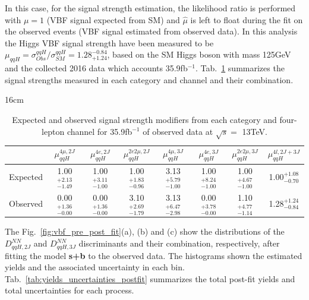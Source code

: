 In this case, for the signal strength estimation, the likelihood ratio is performed with $\mu = 1$ (VBF signal expected from SM) and $\hat{\mu}$ is left to float during the fit on the observed events (VBF signal estimated from observed data). In this analysis the Higgs VBF signal strength have been measured to be $\mu_{qqH} = \sigma_{Obs}^{qqH}/\sigma_{SM}^{qqH} = 1.28_{+1.24}^{-0.84}$, based on the SM Higgs boson with mass 125GeV and the collected 2016 data which accounts 35.9fb$^{-1}$. Tab.~\ref{tab:vbf_signal_strengths} summarizes the signal strengths measured in each category and channel and their combination.

\begin{table}[hbtp]{16cm}
	\caption{Expected and observed signal strength modifiers from each category and four-lepton channel for 35.9fb$^{-1}$ of observed data at $\sqrt{s}=$ 13TeV.}
	\centering
	\begin{tabular}{c|c|c|c|c|c|c|c}
		\hline
		\rowcolor{light_gray}
		& $\mu_{qqH}^{4\mu,2J}$ & $\mu_{qqH}^{4e,2J}$ & $\mu_{qqH}^{2e2\mu,2J}$ & $\mu_{qqH}^{4\mu,3J}$ & $\mu_{qqH}^{4e,3J}$ & $\mu_{qqH}^{2e2\mu,3J}$ & $\mu_{qqH}^{4l,2J+3J}$\\
		\hline
		Expected & 1.00$^{+2.13}_{-1.49}$ & 1.00$^{+3.11}_{-1.00}$ & 1.00$^{+1.83}_{-0.96}$ & 3.13$^{+5.79}_{-1.00}$ & 1.00$^{+8.24}_{-1.00}$ & 1.00$^{+4.67}_{-1.00}$ & 1.00$^{+1.08}_{-0.70}$ \\
		\hline
		Observed & 0.00$^{+1.36}_{-0.00}$ & 0.00$^{+1.36}_{-0.00}$ & 3.10$^{+2.69}_{-1.79}$ & 3.13$^{+6.47}_{-2.98}$ & 0.00$^{+3.78}_{-0.00}$ & 1.10$^{+4.77}_{-1.14}$ & 1.28$^{+1.24}_{-0.84}$ \\ 
		\hline
	\end{tabular}
	\label{tab:vbf_signal_strengths}
\end{table}

The Fig.~\ref{fig:vbf_pre_post_fit}(a), (b) and (c) show the distributions of the $D_{qqH,2J}^{NN}$ and $D_{qqH,3J}^{NN}$ discriminants and their combination, respectively, after fitting the model \textbf{s+b} to the observed data. The histograms shown the estimated yields and the associated uncertainty in each bin. Tab.~\ref{tab:yields_uncertainties_postfit} summarizes the total post-fit yields and total uncertainties for each process.

